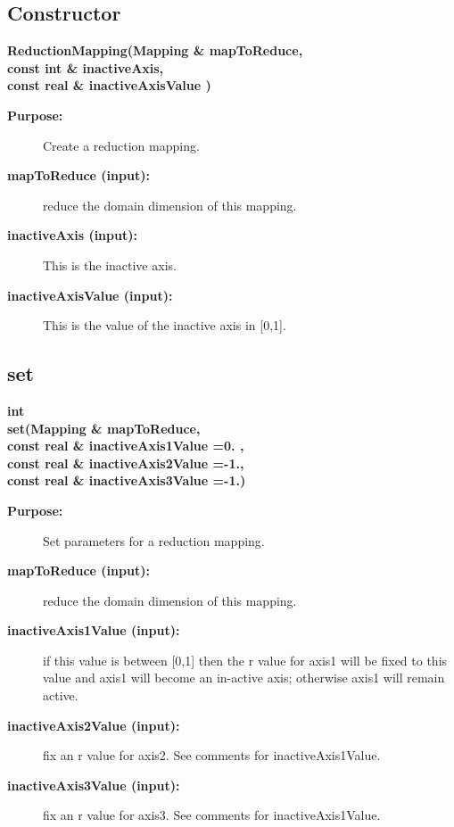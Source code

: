 \subsection{Constructor}
 
\begin{flushleft} \textbf{%
\settowidth{\ReductionMappingIncludeArgIndent}{ReductionMapping(}%
ReductionMapping(Mapping \& mapToReduce, \\ 
\hspace{\ReductionMappingIncludeArgIndent}const int \& inactiveAxis,\\ 
\hspace{\ReductionMappingIncludeArgIndent}const real \& inactiveAxisValue )
}\end{flushleft}
\begin{description}
\item[{\bf Purpose:}]  Create a reduction mapping.

\item[{\bf mapToReduce (input):}]  reduce the domain dimension of this mapping.
\item[{\bf inactiveAxis (input):}]  This is the inactive axis.
\item[{\bf inactiveAxisValue (input):}]  This is the value of the inactive axis in [0,1].

\end{description}
\subsection{set}
 
\begin{flushleft} \textbf{%
int   \\ 
\settowidth{\ReductionMappingIncludeArgIndent}{set(}%
set(Mapping \& mapToReduce, \\ 
\hspace{\ReductionMappingIncludeArgIndent}const real \& inactiveAxis1Value  =0. ,\\ 
\hspace{\ReductionMappingIncludeArgIndent}const real \& inactiveAxis2Value  =-1.,\\ 
\hspace{\ReductionMappingIncludeArgIndent}const real \& inactiveAxis3Value  =-1.)
}\end{flushleft}
\begin{description}
\item[{\bf Purpose:}]  Set parameters for a reduction mapping.

\item[{\bf mapToReduce (input):}]  reduce the domain dimension of this mapping.
\item[{\bf inactiveAxis1Value (input):}]  if this value is between [0,1] then the r value
      for axis1 will be fixed to this value and axis1 will become an in-active axis;
       otherwise axis1 will remain active.
\item[{\bf inactiveAxis2Value (input):}]  fix an r value for axis2. See comments for inactiveAxis1Value.
\item[{\bf inactiveAxis3Value (input):}]  fix an r value for axis3. See comments for inactiveAxis1Value.

\end{description}
